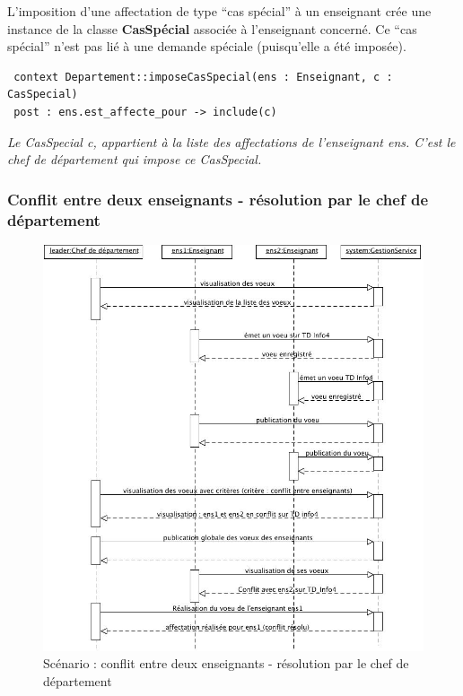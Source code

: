  \indent L'imposition d'une affectation de type ``cas spécial'' à un enseignant crée une instance de la classe \textbf{CasSpécial} associée à l'enseignant concerné. Ce ``cas spécial'' n'est pas lié à une demande spéciale (puisqu'elle a été imposée).

 \begin{verbatim}
 context Departement::imposeCasSpecial(ens : Enseignant, c : CasSpecial)
 post : ens.est_affecte_pour -> include(c)
 \end{verbatim}
 \emph{Le CasSpecial c, appartient à la liste des affectations de l'enseignant ens. C'est le chef de département qui impose ce CasSpecial.}



 \subsubsection{Conflit entre deux enseignants - résolution par le chef de département}
 \begin{figure}[!htbp]
 \begin{center}
 \includegraphics[width=15cm]{fig/scenario1.jpg}
 \caption{Scénario : conflit entre deux enseignants - résolution par le chef de département}
 \end{center}
 \end{figure}

